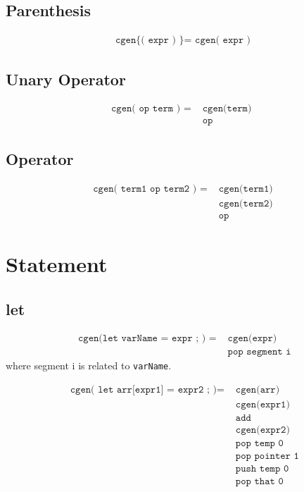 \documentclass[a4paper]{book}
\begin{document}
\subsection*{Parenthesis}
\begin{align*}
    \texttt{cgen\{ ( expr ) \} = cgen( expr )}
\end{align*}

\subsection*{Unary Operator}
\begin{align*}
    \texttt{cgen( op term ) } = & \texttt{ cgen(term) } \\
    & \texttt{ op }
\end{align*}

\subsection*{Operator}
\begin{align*}
    \texttt{ cgen( term1 op term2 ) } = & \texttt{ cgen(term1) } \\
    & \texttt{ cgen(term2) } \\
    & \texttt{ op }
\end{align*}


\section*{Statement}

\subsection*{let}
\begin{align*}
    \texttt{ cgen(let varName = expr ; ) } = & \texttt{ cgen(expr) } \\
    & \texttt{ pop segment i}
\end{align*}
where \colorbox{bl}{segment i} is related to \texttt{varName}.


\begin{align*}
    \texttt{ cgen( let arr[expr1] = expr2 ; )} = & \texttt{ cgen(arr) } \\
    & \texttt{ cgen(expr1) } \\
    & \texttt{ add } \\
    & \texttt{ cgen(expr2)} \\
    & \texttt{ pop temp 0} \\
    & \texttt{ pop pointer 1} \\
    & \texttt{ push temp 0} \\
    & \texttt{ pop that 0}
\end{align*}
\end{document}
